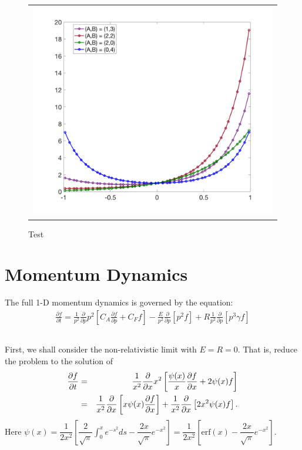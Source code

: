 \documentclass[final,leqno]{siamltex704}
\begin{document}
\begin{figure}[H]
\centering
\begin{tabular}{c}
  \includegraphics[width=.95\textwidth]{./test_full}
  \end{tabular}
\caption{Test }
\end{figure}


\section{Momentum Dynamics}
The full 1-D momentum dynamics is governed by the equation:
\begin{eqnarray}
\frac{\partial f}{\partial t}=\frac{1}{p^2}\frac{\partial}{\partial p}p^2\left[C_A\frac{\partial f}{\partial p}+C_Ff\right]-\frac{E}{p^2}\frac{\partial}{\partial p}\left[p^2f\right]+R\frac{1}{p^2}\frac{\partial}{\partial p}\left[p^3\gamma f\right]
\end{eqnarray}

\subsection{}
First, we shall consider the non-relativistic limit with $E=R=0$. That is, reduce the problem to the solution of 
\begin{eqnarray}
\frac{\partial f}{\partial t}&=&\frac{1}{x^2}\frac{\partial}{\partial x}x^2\left[\frac{\psi(x)}{x}\frac{\partial f}{\partial x}+2\psi(x)f\right]\notag\\
&=&\frac{1}{x^2}\frac{\partial}{\partial x}\left[ x\psi(x)\frac{\partial f}{\partial x}\right] + \frac{1}{x^2}\frac{\partial}{\partial x}\left[2x^2\psi(x)f \right].
\end{eqnarray}
Here $\psi(x) = \dfrac{1}{2x^2}\left[\dfrac{2}{\sqrt{\pi}}\int_0^{x}e^{-s^2}ds-\dfrac{2x}{\sqrt{\pi}}e^{-x^2}\right]=\dfrac{1}{2x^2}\left[\text{erf}(x)-\dfrac{2x}{\sqrt{\pi}}e^{-x^2}\right].$
\end{document}
